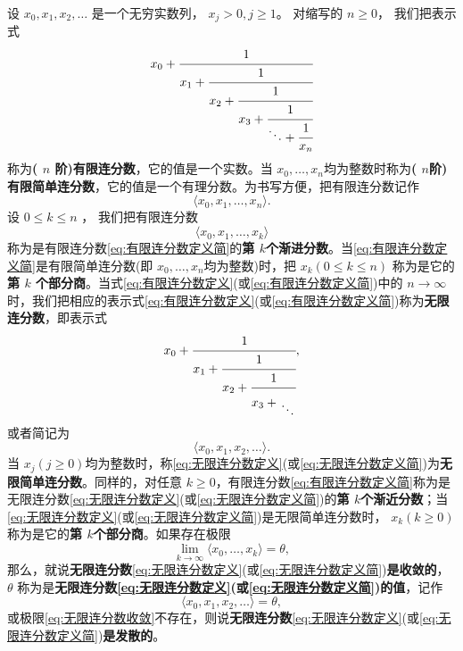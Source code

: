 \begin{definition}
	设 \( x_0, x_1, x_2, \dots \) 是一个无穷实数列， \( x_j > 0, j \geqslant 1 \)。 对缩写的 \( n \geqslant 0 \)， 我们把表示式
	\begin{equation}\label{eq:有限连分数定义}
		x_0 +
		\cfrac{1}{x_1 +
			\cfrac{1}{x_2 +
				\cfrac{1}{x_3 +
					\cfrac{1}{\ddots +
						\cfrac{1}{x_n}
					}}}}
	\end{equation}
	称为\textbf{( \( n \) 阶)有限连分数}，它的值是一个实数。当 \( x_0, \dots, x_n
	\)均为整数时称为\textbf{( \( n \)阶) 有限简单连分数}，它的值是一个有理分数。为书写方便，把有限连分数记作
	\begin{equation}
		\langle x_0,x_1,\dots,x_n\rangle.
		\label{eq:有限连分数定义简}
	\end{equation}
	设 \( 0 \leqslant k \leqslant n \) ， 我们把有限连分数
	\begin{equation}
		\langle x_0, x_1, \dots, x_k\rangle
		\label{eq:第k个渐近分数}
	\end{equation}
	称为是有限连分数\eqref{eq:有限连分数定义简}的\textbf{第 \( k \)个渐进分数}。当\eqref{eq:有限连分数定义简}是有限简单连分数(即 \( x_0,\dots,x_n
	\)均为整数)时，把 \( x_k(0 \leqslant k \leqslant n) \) 称为是它的\textbf{第 \( k \)
		个部分商}。当式\eqref{eq:有限连分数定义}(或\eqref{eq:有限连分数定义简})中的 \( n \to \infty
	\)时，我们把相应的表示式\eqref{eq:有限连分数定义}(或\eqref{eq:有限连分数定义简})称为\textbf{无限连分数}，即表示式
	\begin{equation}\label{eq:无限连分数定义}
		x_0 + \cfrac{1}{x_1 +
			\cfrac{1}{x_2 +
				\cfrac{1}{x_3 +
					\genfrac{}{}{0pt}{}{\vphantom{1}}{\ddots}
				}}},
	\end{equation}
	或者简记为
	\begin{equation}
		\langle x_0, x_1, x_2, \dots\rangle.
		\label{eq:无限连分数定义简}
	\end{equation}
	当 \( x_j(j \geqslant 0) \)均为整数时，称\eqref{eq:无限连分数定义}(或\eqref{eq:无限连分数定义简})为\textbf{无限简单连分数}。同样的，对任意
	\( k \geqslant 0
	\)，有限连分数\eqref{eq:有限连分数定义简}称为是无限连分数\eqref{eq:无限连分数定义}(或\eqref{eq:无限连分数定义简})的\textbf{第 \( k \)个渐近分数}；当\eqref{eq:无限连分数定义}(或\eqref{eq:无限连分数定义简})是无限简单连分数时， \( x_k(k \geqslant 0)
	\)称为是它的\textbf{第 \( k \)个部分商}。如果存在极限
	\begin{equation}
		\lim_{k\to\infty}\langle x_0,\dots,x_k\rangle = \theta,
		\label{eq:无限连分数收敛}
	\end{equation}
	那么，就说\textbf{无限连分数}\eqref{eq:无限连分数定义}(或\eqref{eq:无限连分数定义简})\textbf{是收敛的}， \( \theta \)
	称为是\textbf{无限连分数\eqref{eq:无限连分数定义}(或\eqref{eq:无限连分数定义简})的值}，记作
	\begin{equation}
		\langle x_0,x_1,x_2,\dots\rangle = \theta,
		\label{eq:无限连分数值}
	\end{equation}
	或极限\eqref{eq:无限连分数收敛}不存在，则说\textbf{无限连分数}\eqref{eq:无限连分数定义}(或\eqref{eq:无限连分数定义简})\textbf{是发散的}。
\end{definition}
